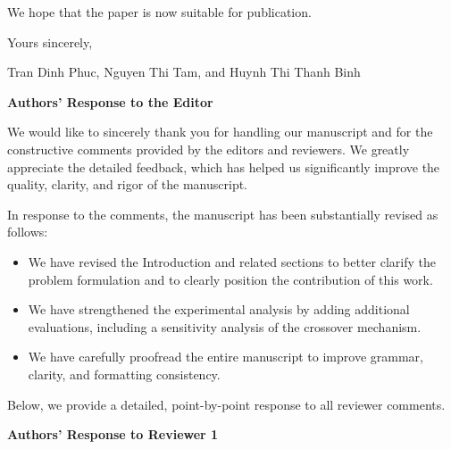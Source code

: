 \documentclass[11pt]{article}
\begin{document}
\noindent We hope that the paper is now suitable for publication.

\noindent Yours sincerely,

\noindent Tran Dinh Phuc, Nguyen Thi Tam, and Huynh Thi Thanh Binh\vspace{5mm}


\setlength{\parskip}{0pt} %

\clearpage

\begin{center}
\textbf{\Large Authors' Response to the Editor}
\end{center}
We would like to sincerely thank you for handling our manuscript and for the constructive comments provided by the editors and reviewers. We greatly appreciate the detailed feedback, which has helped us significantly improve the quality, clarity, and rigor of the manuscript.

In response to the comments, the manuscript has been substantially revised as follows:
\begin{itemize}[leftmargin=2em]
\item We have revised the Introduction and related sections to better clarify the problem formulation and to clearly position the contribution of this work.
\item We have strengthened the experimental analysis by adding additional evaluations, including a sensitivity analysis of the crossover mechanism.
\item We have carefully proofread the entire manuscript to improve grammar, clarity, and formatting consistency.
\end{itemize}

Below, we provide a detailed, point-by-point response to all reviewer comments.
\newpage
\begin{center}
\textbf{\Large Authors' Response to Reviewer 1}
\end{center}
\end{document}

